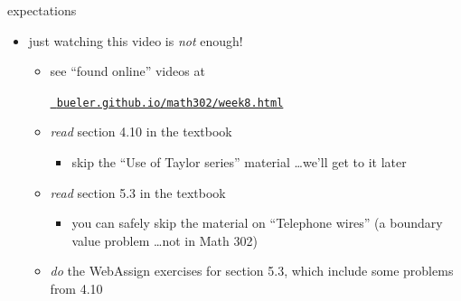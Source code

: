 \documentclass[urlcolor=blue,dvipsnames]{beamer}
\begin{document}
\begin{frame}{expectations}

\begin{itemize}
\item just watching this video is \emph{not} enough!
     \begin{itemize}
     \item see ``found online'' videos at

     \centerline{\href{https://bueler.github.io/math302/week8.html}{\tt \color{cyan} bueler.github.io/math302/week8.html}}
     \item \emph{read} section 4.10 in the textbook
         \begin{itemize}
         \item skip the ``Use of Taylor series'' material \dots we'll get to it later
         \end{itemize}
     \item \emph{read} section 5.3 in the textbook
         \begin{itemize}
         \item you can safely skip the material on ``Telephone wires'' (a boundary value problem \dots not in Math 302)
         \end{itemize}
     \item \emph{do} the WebAssign exercises for section 5.3, which include some problems from 4.10
     \end{itemize}
\end{itemize}
\end{frame}
\end{document}
